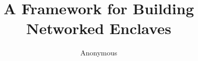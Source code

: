 \documentclass[letterpaper,twocolumn,10pt]{article}
\begin{document}
\title{A Framework for Building Networked Enclaves}

\author{Anonymous}

\maketitle










\balance
\printbibliography
\end{document}
